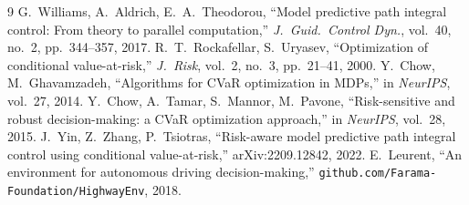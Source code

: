 \documentclass[letterpaper, 10 pt, conference]{ieeeconf}  %
\begin{document}
\begin{thebibliography}{9}
 G.~Williams, A.~Aldrich, E.~A.~Theodorou, ``Model predictive path integral control: From theory to parallel computation,'' \emph{J.~Guid.~Control Dyn.}, vol.~40, no.~2, pp.~344--357, 2017.
 R.~T.~Rockafellar, S.~Uryasev, ``Optimization of conditional value-at-risk,'' \emph{J.~Risk}, vol.~2, no.~3, pp.~21--41, 2000.
 Y.~Chow, M.~Ghavamzadeh, ``Algorithms for CVaR optimization in MDPs,'' in \emph{NeurIPS}, vol.~27, 2014.
 Y.~Chow, A.~Tamar, S.~Mannor, M.~Pavone, ``Risk-sensitive and robust decision-making: a CVaR optimization approach,'' in \emph{NeurIPS}, vol.~28, 2015.
 J.~Yin, Z.~Zhang, P.~Tsiotras, ``Risk-aware model predictive path integral control using conditional value-at-risk,'' arXiv:2209.12842, 2022.
 E.~Leurent, ``An environment for autonomous driving decision-making,'' \texttt{github.com/Farama-Foundation/HighwayEnv}, 2018.
\end{thebibliography}
\end{document}
